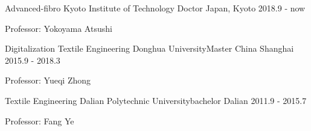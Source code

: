 
\begin{cventries}

  \cventry
  {Advanced-fibro} %
    {Kyoto Institute of Technology \quad Doctor} %
    {Japan, Kyoto} %
    {2018.9 - now} %
    {
      \begin{cvitems} %
        \item {Professor: Yokoyama Atsushi}
      \end{cvitems}
    }

  \cventry
    {Digitalization Textile Engineering} %
    {Donghua University\quad Master} %
    {China Shanghai} %
    {2015.9 - 2018.3} %
    {
      \begin{cvitems} %
        \item {Professor: Yueqi Zhong}
      \end{cvitems}
    }

  \cventry
    {Textile Engineering} %
    {Dalian Polytechnic University\quad bachelor} %
    {Dalian} %
    {2011.9 - 2015.7} %
    {
      \begin{cvitems} %
        \item {Professor: Fang Ye}
      \end{cvitems}
    }

\end{cventries}
